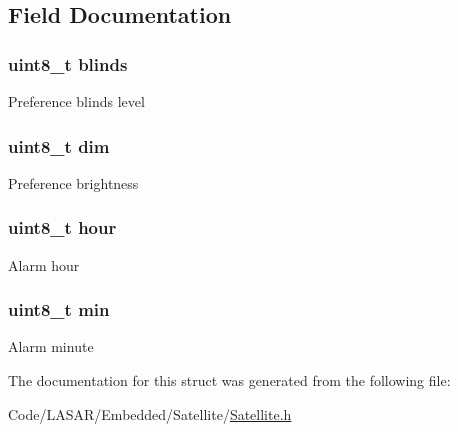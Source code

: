 \subsection{Field Documentation}
\hypertarget{struct_pref_ad1733fa682379b1821f819f56447c66a}{
\subsubsection[{blinds}]{\setlength{\rightskip}{0pt plus 5cm}uint8\-\_\-t {\bf blinds}}}\label{struct_pref_ad1733fa682379b1821f819f56447c66a}
Preference blinds level \hypertarget{struct_pref_acd6b0c9d182822b4646f744da608eb78}{
\subsubsection[{dim}]{\setlength{\rightskip}{0pt plus 5cm}uint8\-\_\-t {\bf dim}}}\label{struct_pref_acd6b0c9d182822b4646f744da608eb78}
Preference brightness \hypertarget{struct_pref_ae5af4ff48939d13d480f87e56a9385d6}{
\subsubsection[{hour}]{\setlength{\rightskip}{0pt plus 5cm}uint8\-\_\-t {\bf hour}}}\label{struct_pref_ae5af4ff48939d13d480f87e56a9385d6}
Alarm hour \hypertarget{struct_pref_ac9b481208b43f7c37ed25e446bdec692}{
\subsubsection[{min}]{\setlength{\rightskip}{0pt plus 5cm}uint8\-\_\-t {\bf min}}}\label{struct_pref_ac9b481208b43f7c37ed25e446bdec692}
Alarm minute 

The documentation for this struct was generated from the following file\-:\begin{DoxyCompactItemize}
\item 
Code/\-L\-A\-S\-A\-R/\-Embedded/\-Satellite/\hyperlink{_satellite_8h}{Satellite.\-h}\end{DoxyCompactItemize}
